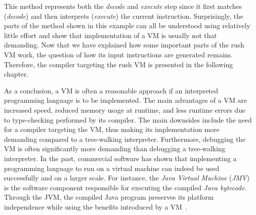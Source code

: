 This method represents both the \emph{decode} and \emph{execute} step since it first matches (\emph{decode}) and then interprets (\emph{execute}) the current instruction.
Surprisingly, the parts of the method shown in this example can all be understood using relatively little effort and show that implementation of a VM is usually not that demanding.
Now that we have explained how some important parts of the rush VM work, the question of how its input instructions are generated remains.
Therefore, the compiler targeting the rush VM is presented in the following chapter.

As a conclusion, a VM is often a reasonable approach if an interpreted programming language is to be implemented.
The main advantages of a VM are increased speed, reduced memory usage at runtime, and less runtime errors due to type-checking performed by its compiler.
The main downsides include the need for a compiler targeting the VM, thus making its implementation more demanding compared to a tree-walking interpreter.
Furthermore, debugging the VM is often significantly more demanding than debugging a tree-walking interpreter.
In the past, commercial software has shown that implementing a programming language to run on a virtual machine can indeed be used successfully and on a larger scale.
For instance, the \emph{Java Virtual Machine} (\emph{JMV}) is the software component responsible for executing the compiled \emph{Java bytecode}.
Through the JVM, the compiled Java program preserves its platform independence while using the benefits introduced by a VM~\cite[Chapter~1.2]{Lindholm2014-jb}. %
